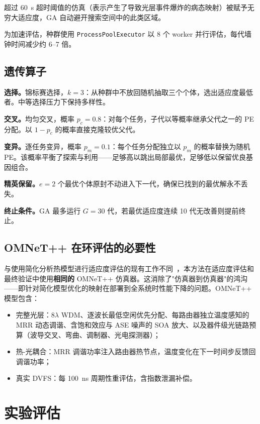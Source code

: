 \documentclass[conference]{IEEEtran}
\begin{document}
超过 \SI{60}{\second} 超时阈值的仿真（表示产生了导致光层事件爆炸的病态映射）被赋予无穷大适应度，GA 自动避开搜索空间中的此类区域。

为加速评估，种群使用 \texttt{ProcessPoolExecutor} 以 8 个 worker 并行评估，每代墙钟时间减少约 6--7 倍。

\subsection{遗传算子}

\textbf{选择。}锦标赛选择，$k = 3$：从种群中不放回随机抽取三个个体，选出适应度最低者。中等选择压力下保持多样性。

\textbf{交叉。}均匀交叉，概率 $p_c = 0.8$：对每个任务，子代以等概率继承父代之一的 PE 分配。以 $1 - p_c$ 的概率直接克隆较优父代。

\textbf{变异。}逐任务变异，概率 $p_m = 0.1$：每个任务分配独立以 $p_m$ 的概率替换为随机 PE。该概率平衡了探索与利用——足够高以跳出局部最优，足够低以保留优良基因组合。

\textbf{精英保留。}$e = 2$ 个最优个体原封不动进入下一代，确保已找到的最优解永不丢失。

\textbf{终止条件。}GA 最多运行 $G = 30$ 代，若最优适应度连续 10 代无改善则提前终止。

\subsection{OMNeT++ 在环评估的必要性}

与使用简化分析热模型进行适应度评估的现有工作不同~\cite{chittamuru2015}，本方法在适应度评估和最终验证中使用\textbf{相同的} OMNeT++ 仿真器。这消除了"仿真器到仿真器"的鸿沟——即针对简化模型优化的映射在部署到全系统时性能下降的问题。OMNeT++ 模型包含：

\begin{itemize}
\item 完整光层：8$\lambda$ WDM、逐波长最低空闲优先分配、每路由器独立温度感知的 MRR 动态调谐、含饱和效应与 ASE 噪声的 SOA 放大、以及器件级光链路预算（波导交叉、弯曲、调制器、光电探测器）；
\item 热-光耦合：MRR 调谐功率注入路由器热节点，温度变化在下一时间步反馈回调谐功率；
\item 真实 DVFS：每 \SI{100}{\nano\second} 周期性重评估，含指数泄漏补偿。
\end{itemize}

\section{实验评估}
\end{document}
